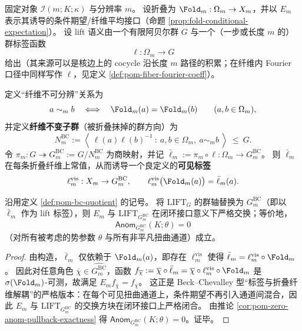 \begin{definition}\label{def:pom-bc-quotient}
固定对象 \(\mathcal{I}(m;K;\kappa)\) 与分辨率 \(m\)。
设折叠为 \(\Fold_m:\Omega_m\to X_m\)，并以 \(E_m\) 表示其诱导的条件期望/纤维平均接口（命题 \ref{prop:fold-conditional-expectation}）。
设 lift 语义由一个有限阿贝尔群 \(G\) 与一个（一步或长度 \(m\) 的）群标签函数
\[
\ell:\Omega_m\to G
\]
给出（其来源可以是核边上的 cocycle 沿长度 \(m\) 路径的积累；在纤维内 Fourier 口径中同样写作 \(\ell\)，见定义 \ref{def:pom-fiber-fourier-coeff}）。
\par
定义“纤维不可分辨”关系为
\[
a\sim_m b\quad\Longleftrightarrow\quad \Fold_m(a)=\Fold_m(b)\qquad(a,b\in\Omega_m),
\]
并定义\textbf{纤维不变子群}（被折叠抹掉的群方向）为
\[
N^{\mathrm{BC}}_m
:=\left\langle\ \ell(a)\ell(b)^{-1}\ :\ a,b\in\Omega_m,\ a\sim_m b\ \right\rangle\ \le\ G.
\]
令 \(\pi_m:G\twoheadrightarrow G^{\mathrm{BC}}_m:=G/N^{\mathrm{BC}}_m\) 为商映射，并记 \(\bar\ell_m:=\pi_m\circ \ell:\Omega_m\to G^{\mathrm{BC}}_m\)。
则 \(\bar\ell_m\) 在每条折叠纤维上常值，从而诱导一个良定义的\textbf{可见标签}
\[
\ell^{\mathrm{vis}}_m:X_m\to G^{\mathrm{BC}}_m,
\qquad
\ell^{\mathrm{vis}}_m\bigl(\Fold_m(a)\bigr)=\bar\ell_m(a).
\]
\end{definition}

\begin{proposition}\label{prop:pom-bc-quotient-strictify}
沿用定义 \ref{def:pom-bc-quotient} 的记号。
将 \(\mathrm{LIFT}_G\) 的群轴替换为 \(G^{\mathrm{BC}}_m\)（即以 \(\bar\ell_m\) 作为 lift 标签），则 \(E_m\) 与 \(\mathrm{LIFT}_{G^{\mathrm{BC}}_m}\) 在闭环接口意义下严格交换；等价地，
\[
\mathsf{Anom}_{G^{\mathrm{BC}}_m}(K;\theta)=0
\]
（对所有被考虑的势参数 \(\theta\) 与所有非平凡扭曲通道）成立。
\end{proposition}
\begin{proof}
由构造，\(\bar\ell_m\) 仅依赖于 \(\Fold_m(a)\)，即存在 \(\ell^{\mathrm{vis}}_m\) 使得 \(\bar\ell_m=\ell^{\mathrm{vis}}_m\circ \Fold_m\)。
因此对任意角色 \(\overline\chi\in\widehat{G^{\mathrm{BC}}_m}\)，函数
\(
f_{\overline\chi}:=\overline\chi\circ \bar\ell_m
=
\overline\chi\circ \ell^{\mathrm{vis}}_m\circ \Fold_m
\)
是 \(\sigma(\Fold_m)\)-可测，故满足 \(E_m f_{\overline\chi}=f_{\overline\chi}\)。
这正是 Beck--Chevalley 型“标签与折叠纤维解耦”的严格版本：在每个可见扭曲通道上，条件期望不再引入通道间混合，因此 \(E_m\) 与 \(\mathrm{LIFT}_{G^{\mathrm{BC}}_m}\) 的交换方块在闭环接口上严格闭合。
由推论 \ref{cor:pom-zero-anom-pullback-exactness} 得 \(\mathsf{Anom}_{G^{\mathrm{BC}}_m}(K;\theta)=0\)。证毕。
\end{proof}

